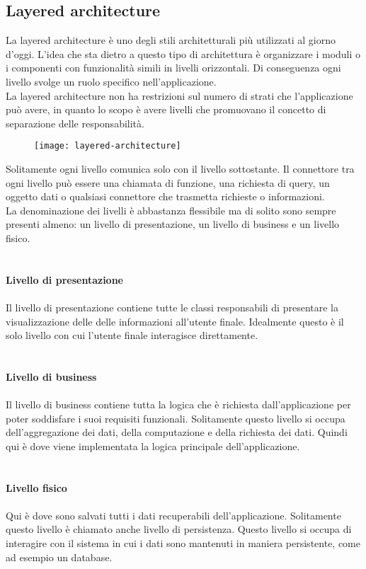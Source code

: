 \subsection{Layered architecture}
La layered architecture è uno degli stili architetturali più utilizzati al giorno d'oggi. L'idea che sta dietro a
questo tipo di architettura è organizzare i moduli o i componenti con funzionalità simili
in livelli orizzontali. Di conseguenza ogni livello svolge un ruolo specifico nell'applicazione.
\\
La layered architecture non ha restrizioni sul numero di strati che l'applicazione può avere, in quanto 
lo scopo è avere livelli che promuovano il concetto di separazione delle responsabilità.
\begin{figure}[!h]
    \centering
    \texttt{[image: layered-architecture]}
\end{figure}
\leavevmode\newline
Solitamente ogni livello comunica solo con il livello sottostante. Il connettore tra ogni livello può 
essere una chiamata di funzione, una richiesta di query, un oggetto dati o qualsiasi connettore che
trasmetta richieste o informazioni.
\\
La denominazione dei livelli è abbastanza flessibile ma di solito sono sempre presenti almeno: un livello di presentazione, un livello
di business e un livello fisico.
\\\\\\
\textbf{Livello di presentazione}
\\\\
Il livello di presentazione contiene tutte le classi responsabili di presentare la visualizzazione delle
delle informazioni all'utente finale. Idealmente questo è il solo livello con cui l'utente finale 
interagisce direttamente.
\\\\\\
\textbf{Livello di business}
\\\\
Il livello di business contiene tutta la logica che è richiesta dall'applicazione per poter soddisfare i 
suoi requisiti funzionali. Solitamente questo livello si occupa dell'aggregazione dei dati, della computazione
e della richiesta dei dati. Quindi qui è dove viene implementata la logica principale dell'applicazione.
\\\\\\
\textbf{Livello fisico}
\\\\
Qui è dove sono salvati tutti i dati recuperabili dell'applicazione. Solitamente questo livello è chiamato
anche livello di persistenza. Questo livello si occupa di interagire con il sistema in cui i dati 
sono mantenuti in maniera persistente, come ad esempio un database.

